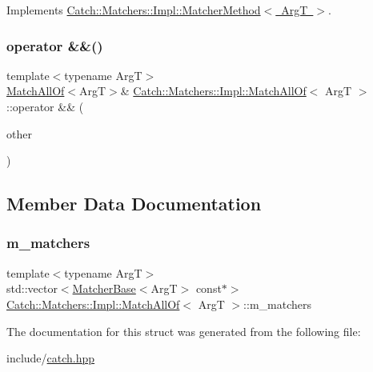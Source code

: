 Implements \mbox{\hyperlink{struct_catch_1_1_matchers_1_1_impl_1_1_matcher_method_ae0920ff9e817acf08e1bb0cbcb044e30}{Catch\+::\+Matchers\+::\+Impl\+::\+Matcher\+Method$<$ Arg\+T $>$}}.

\mbox{\label{struct_catch_1_1_matchers_1_1_impl_1_1_match_all_of_a60abff7d95c81453413179bc5db51f88}} 
\subsubsection{\texorpdfstring{operator \&\&()}{operator \&\&()}}
{\footnotesize\ttfamily template$<$typename ArgT$>$ \\
\mbox{\hyperlink{struct_catch_1_1_matchers_1_1_impl_1_1_match_all_of}{Match\+All\+Of}}$<$ArgT$>$\& \mbox{\hyperlink{struct_catch_1_1_matchers_1_1_impl_1_1_match_all_of}{Catch\+::\+Matchers\+::\+Impl\+::\+Match\+All\+Of}}$<$ ArgT $>$\+::operator \&\& (\begin{DoxyParamCaption}\item[{\mbox{\hyperlink{struct_catch_1_1_matchers_1_1_impl_1_1_matcher_base}{Matcher\+Base}}$<$ ArgT $>$ const \&}]{other }\end{DoxyParamCaption})\hspace{0.3cm}{\ttfamily [inline]}}



\subsection{Member Data Documentation}
\mbox{\label{struct_catch_1_1_matchers_1_1_impl_1_1_match_all_of_a98d6a2611f195a4a5c49f92fd877be9a}} 
\subsubsection{\texorpdfstring{m\_matchers}{m\_matchers}}
{\footnotesize\ttfamily template$<$typename ArgT$>$ \\
std\+::vector$<$\mbox{\hyperlink{struct_catch_1_1_matchers_1_1_impl_1_1_matcher_base}{Matcher\+Base}}$<$ArgT$>$ const$\ast$$>$ \mbox{\hyperlink{struct_catch_1_1_matchers_1_1_impl_1_1_match_all_of}{Catch\+::\+Matchers\+::\+Impl\+::\+Match\+All\+Of}}$<$ ArgT $>$\+::m\+\_\+matchers}



The documentation for this struct was generated from the following file\+:\begin{DoxyCompactItemize}
\item 
include/\mbox{\hyperlink{catch_8hpp}{catch.\+hpp}}\end{DoxyCompactItemize}
